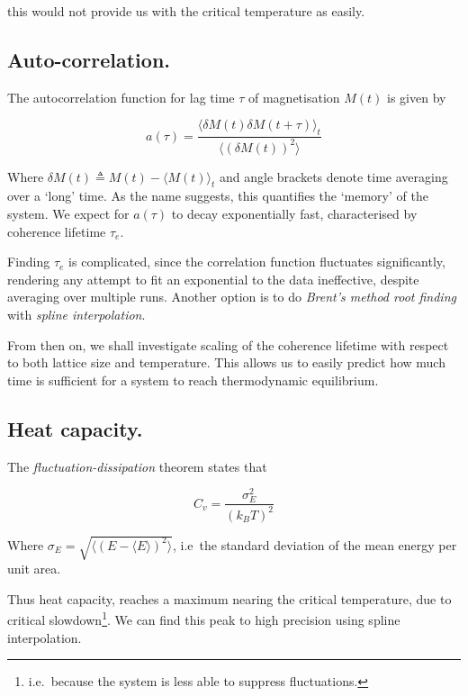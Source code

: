 \documentclass[12pt]{article}
\begin{document}
this would not provide us with the critical temperature as easily. 
\subsection{Auto-correlation.}\label{sec:auto_correlation}

The autocorrelation function for lag time \(\tau \) of magnetisation \(M(t)\) is given by

\begin{equation}
  a(\tau ) = \frac{\langle  \delta M(t) \delta M(t+ \tau) \rangle_t } {\langle  {(\delta M(t))}^2  \rangle}
\end{equation}

Where \( \delta M(t) \triangleq M(t) - \langle  M(t) \rangle_t \) and angle brackets denote time averaging over a `long' time. As the name suggests, this quantifies the `memory' of the system. We expect for \(a (\tau)\) to decay exponentially fast, characterised by coherence lifetime \( \tau_e\).

Finding \(\tau_e\) is complicated, since the correlation function fluctuates significantly, rendering any attempt to fit an exponential to the data ineffective, despite averaging over multiple runs. Another option is to do \emph{Brent's method root finding}\cite{Brent} with \emph{spline interpolation}.

From then on, we shall investigate scaling of the coherence lifetime with respect to both lattice size and temperature. This allows us to easily predict how much time is sufficient for a system to reach thermodynamic equilibrium. 

\subsection{Heat capacity.}\label{sec:heat_capacity}

The \emph{fluctuation-dissipation} theorem\cite{fdt} states that

\begin{equation}\label{eq:fluctuation-dissipation theorem}
  C_v = \frac{\sigma_E^2}{ {(k_B T)}^2}
\end{equation}

Where \( \sigma_E = \sqrt{\langle  {(E - \langle E \rangle)}^2 \rangle}\), i.e~the standard deviation of the mean energy per unit area.

Thus heat capacity, reaches a maximum nearing the critical temperature, due to critical slowdown\footnote{i.e.~because the system is less able to suppress fluctuations.}. We can find this peak to high precision using spline interpolation. 
\end{document}

